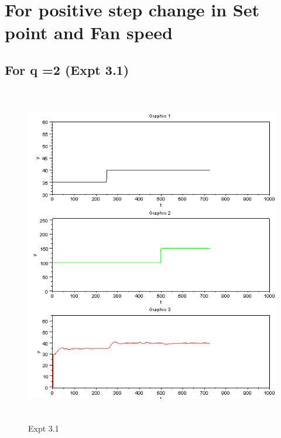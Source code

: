 \section{For positive step change in Set point and Fan speed }
\subsection{For q =2 (Expt 3.1) }
\begin{figure}[H]
  \includegraphics[width=12cm, height=15cm]{mpc/3_1.PNG}
  \caption{Expt 3.1}
\end{figure}

